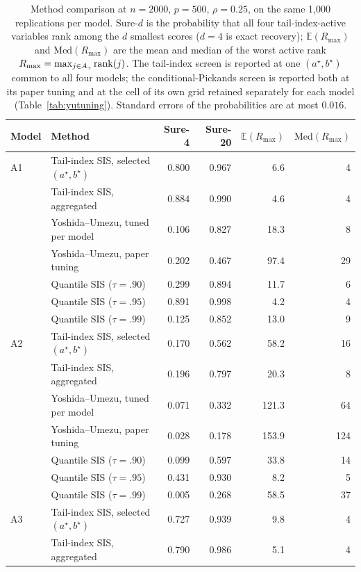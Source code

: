 \begin{table}[t]
\centering
\caption{Method comparison at $n=2000$, $p=500$, $\rho=0.25$, on the same 1{,}000 replications per model. Sure-$d$ is the probability that all four tail-index-active variables rank among the $d$ smallest scores ($d=4$ is exact recovery); $\mathbb{E}(R_{\max})$ and $\mathrm{Med}(R_{\max})$ are the mean and median of the worst active rank $R_{\max}=\max_{j\in A_\gamma}\mathrm{rank}(j)$. The tail-index screen is reported at one $(a^\star,b^\star)$ common to all four models; the conditional-Pickands screen is reported both at its paper tuning and at the cell of its own grid retained separately for each model (Table~\ref{tab:yutuning}). Standard errors of the probabilities are at most $0.016$.}
\label{tab:cmp500}
\begin{tabular}{llrrrr}
\toprule
Model & Method & Sure-4 & Sure-20 & $\mathbb{E}(R_{\max})$ & $\mathrm{Med}(R_{\max})$\\
\midrule
A1 & Tail-index SIS, selected $(a^\star,b^\star)$ & 0.800 & 0.967 & 6.6 & 4\\
 & Tail-index SIS, aggregated & 0.884 & 0.990 & 4.6 & 4\\
 & Yoshida--Umezu, tuned per model & 0.106 & 0.827 & 18.3 & 8\\
 & Yoshida--Umezu, paper tuning & 0.202 & 0.467 & 97.4 & 29\\
 & Quantile SIS ($\tau=.90$) & 0.299 & 0.894 & 11.7 & 6\\
 & Quantile SIS ($\tau=.95$) & 0.891 & 0.998 & 4.2 & 4\\
 & Quantile SIS ($\tau=.99$) & 0.125 & 0.852 & 13.0 & 9\\
\addlinespace
A2 & Tail-index SIS, selected $(a^\star,b^\star)$ & 0.170 & 0.562 & 58.2 & 16\\
 & Tail-index SIS, aggregated & 0.196 & 0.797 & 20.3 & 8\\
 & Yoshida--Umezu, tuned per model & 0.071 & 0.332 & 121.3 & 64\\
 & Yoshida--Umezu, paper tuning & 0.028 & 0.178 & 153.9 & 124\\
 & Quantile SIS ($\tau=.90$) & 0.099 & 0.597 & 33.8 & 14\\
 & Quantile SIS ($\tau=.95$) & 0.431 & 0.930 & 8.2 & 5\\
 & Quantile SIS ($\tau=.99$) & 0.005 & 0.268 & 58.5 & 37\\
\addlinespace
A3 & Tail-index SIS, selected $(a^\star,b^\star)$ & 0.727 & 0.939 & 9.8 & 4\\
 & Tail-index SIS, aggregated & 0.790 & 0.986 & 5.1 & 4\\

\end{tabular}
\end{table}
